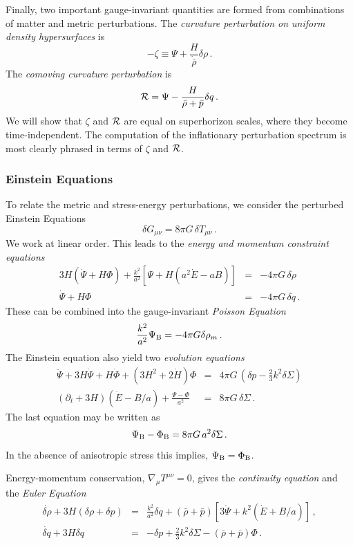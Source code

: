 \documentclass[12pt,letterpaper,rotate]{article}
\def\beq{\begin{equation}}
\def\eeq{\end{equation}}
\def\R{{\cal R}}
\begin{document}
{Finally, two important gauge-invariant quantities are formed from combinations of matter and metric perturbations.
The {\it curvature perturbation on uniform density hypersurfaces} is
\beq
- \zeta \equiv \Psi + \frac{H}{\dot {\bar \rho}} \delta \rho\, . 
\eeq
The {\it comoving curvature perturbation} is
\beq
{\cal R} = \Psi - \frac{H}{\bar \rho + \bar p} \delta q\, .
\eeq
We will show that $\zeta$ and $\R$ are equal on superhorizon scales, where they become time-independent. The computation of the inflationary perturbation spectrum is most clearly phrased in terms of $\zeta$ and $\R$.

\subsubsection{Einstein Equations}

To relate the metric and stress-energy perturbations, we consider the perturbed Einstein Equations
\beq
\delta G_{\mu \nu} = 8 \pi G\, \delta T_{\mu \nu}\, .
\eeq
We work at linear order.
This leads to the
{\it energy and momentum constraint equations}
 \begin{eqnarray}
3H(\dot \Psi + H \Phi) + \frac{k^2}{a^2} \left[ \Psi + H(a^2 \dot E- aB)\right] &=& - 4\pi G \, \delta \rho \\
\dot \Psi + H \Phi &=& - 4\pi G \, \delta q \, .
\end{eqnarray}
These can be combined into the gauge-invariant {\it Poisson Equation}
\beq
\frac{k^2}{a^2} \Psi_{\rm B} = - 4 \pi G \delta \rho_m\, .
\eeq
The Einstein equation also yield two {\it evolution equations}
\begin{eqnarray}
\ddot \Psi + 3 H \dot \Psi + H \dot \Phi + (3 H^2 + 2 \dot H) \Phi &=& 4 \pi G\, \left( \delta p - \frac{2}{3} k^2 \delta \Sigma \right) \\
(\partial_t + 3 H) (\dot E - B/a) + \frac{\Psi - \Phi}{a^2}&=& 8 \pi G\, \delta \Sigma\, .
\end{eqnarray}
The last equation may be written as
\beq
\Psi_{\rm B} - \Phi_{\rm B} = 8 \pi G\, a^2 \delta \Sigma\, .
\eeq
In the absence of anisotropic stress this implies, $\Psi_{\rm B} = \Phi_{\rm B}$.

Energy-momentum conservation, $\nabla_\mu T^{\mu \nu} = 0$, gives the {\it continuity equation} and the {\it Euler Equation}
\begin{eqnarray}
\label{equ:conX}
\dot{\delta \rho} + 3 H (\delta \rho + \delta p) &=& \frac{k^2}{a^2} \delta q + (\bar \rho + \bar p) [3 \dot \Psi + k^2 (\dot E + B/a)] \, ,\\
\dot{\delta q} + 3 H \delta q &=& - \delta p + \frac{2}{3} k^2 \delta \Sigma - (\bar \rho + \bar p) \Phi\, .
\end{eqnarray}

}
\end{document}
